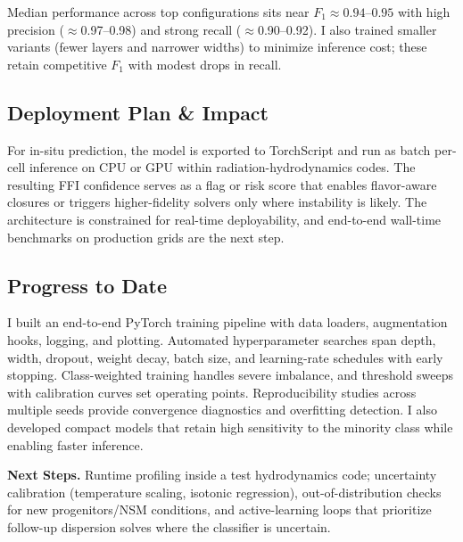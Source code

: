 \documentclass[10pt]{article}
\begin{document}
\begin{center}
Median performance across top configurations sits near $F_1 \approx 0.94$--$0.95$ with high precision ($\approx$0.97--0.98) and strong recall ($\approx$0.90--0.92).
I also trained smaller variants (fewer layers and narrower widths) to minimize inference cost; these retain competitive $F_1$ with modest drops in recall.

\subsection*{Deployment Plan \& Impact}
For in-situ prediction, the model is exported to TorchScript and run as batch per-cell inference on CPU or GPU within radiation-hydrodynamics codes.
The resulting FFI confidence serves as a flag or risk score that enables flavor-aware closures or triggers higher-fidelity solvers only where instability is likely.
The architecture is constrained for real-time deployability, and end-to-end wall-time benchmarks on production grids are the next step.

\subsection*{Progress to Date}
I built an end-to-end PyTorch training pipeline with data loaders, augmentation hooks, logging, and plotting.
Automated hyperparameter searches span depth, width, dropout, weight decay, batch size, and learning-rate schedules with early stopping.
Class-weighted training handles severe imbalance, and threshold sweeps with calibration curves set operating points.
Reproducibility studies across multiple seeds provide convergence diagnostics and overfitting detection.
I also developed compact models that retain high sensitivity to the minority class while enabling faster inference.

\textbf{Next Steps.}
Runtime profiling inside a test hydrodynamics code; uncertainty calibration (temperature scaling, isotonic regression), out-of-distribution checks for new progenitors/NSM conditions, and active-learning loops that prioritize follow-up dispersion solves where the classifier is uncertain.
\end{center}
\end{document}
